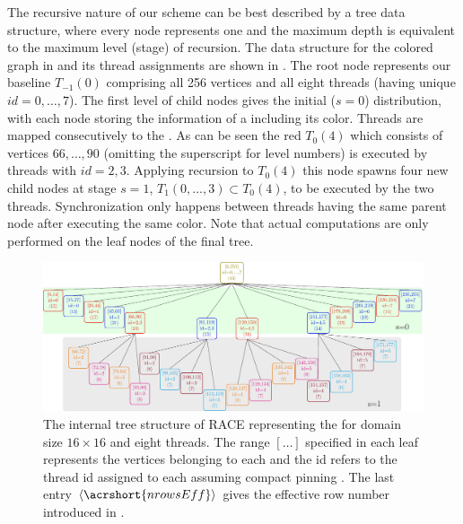 The recursive nature of our scheme can be best  described by a tree data structure, where every node represents one \levelGroup and  the maximum depth is equivalent to the maximum level (stage) of recursion. The data structure for the colored graph in  and its thread assignments are shown in . The root node represents our baseline \levelGroup $T_{-1}(0)$ comprising all 256 vertices and all eight threads (having unique $id=0,\ldots,7$). The first level of child nodes gives the initial ($s=0$) distribution, with each node storing the information of a \levelGroup including its color. Threads are mapped consecutively to the \levelGroups. As can be seen the red $T_0(4)$ \levelGroup which consists of vertices $66,\ldots,90$ (omitting the superscript for level numbers) is executed by threads with $id=2,3$.  Applying recursion to $T_0(4)$ this node spawns four new child nodes at stage $s =1$, \ie \levelGroups $T_1(0,\ldots,3) \subset T_0(4)$, to be executed by the two threads. Synchronization only happens between threads having the same parent node after executing the same color. Note that actual computations are only performed on the leaf nodes of the final tree.
	 \begin{figure}[t]
		 \includegraphics[width=\textwidth, height=0.2\textheight]{pics/recursion/2d-7pt_example/tree/tree}
	 	\caption{The internal tree structure of \acrshort{RACE} representing the \stex for domain size $16 \times 16$ and eight threads. The range $[\ldots]$ specified in each leaf represents the vertices belonging to each \levelGroup and the id refers to the thread id assigned to each \levelGroup assuming compact pinning . The last entry $\langle\acrshort{nrowsEff}\rangle$ gives the effective row number introduced in  . }
	 	\label{fig:rec_2d-7pt_tree}
	 \end{figure}

